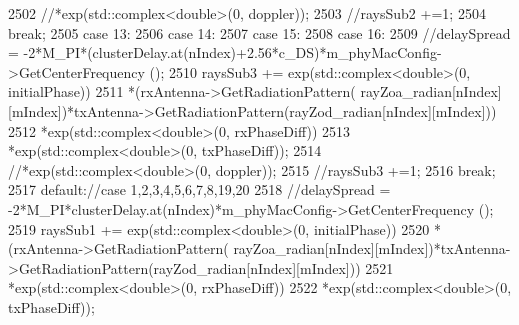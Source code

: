 \begin{DoxyCode}
2502                                                                 \textcolor{comment}{//*exp(std::complex<double>(0, doppler));}
2503                                                         \textcolor{comment}{//raysSub2 +=1;}
2504                                                         \textcolor{keywordflow}{break};
2505                                                 \textcolor{keywordflow}{case} 13:
2506                                                 \textcolor{keywordflow}{case} 14:
2507                                                 \textcolor{keywordflow}{case} 15:
2508                                                 \textcolor{keywordflow}{case} 16:
2509                                                         \textcolor{comment}{//delaySpread =
       -2*M\_PI*(clusterDelay.at(nIndex)+2.56*c\_DS)*m\_phyMacConfig->GetCenterFrequency ();}
2510                                                         raysSub3 += exp(std::complex<double>(0, 
      initialPhase))
2511                                                                 *(rxAntenna->GetRadiationPattern(
      rayZoa\_radian[nIndex][mIndex])*txAntenna->GetRadiationPattern(rayZod\_radian[nIndex][mIndex]))
2512                                                                 *exp(std::complex<double>(0, rxPhaseDiff))
2513                                                                 *exp(std::complex<double>(0, txPhaseDiff));
2514                                                                 \textcolor{comment}{//*exp(std::complex<double>(0, doppler));}
2515                                                         \textcolor{comment}{//raysSub3 +=1;}
2516                                                         \textcolor{keywordflow}{break};
2517                                                 \textcolor{keywordflow}{default}:\textcolor{comment}{//case 1,2,3,4,5,6,7,8,19,20}
2518                                                         \textcolor{comment}{//delaySpread =
       -2*M\_PI*clusterDelay.at(nIndex)*m\_phyMacConfig->GetCenterFrequency ();}
2519                                                         raysSub1 += exp(std::complex<double>(0, 
      initialPhase))
2520                                                                 *(rxAntenna->GetRadiationPattern(
      rayZoa\_radian[nIndex][mIndex])*txAntenna->GetRadiationPattern(rayZod\_radian[nIndex][mIndex]))
2521                                                                 *exp(std::complex<double>(0, rxPhaseDiff))
2522                                                                 *exp(std::complex<double>(0, txPhaseDiff));

\end{DoxyCode}
